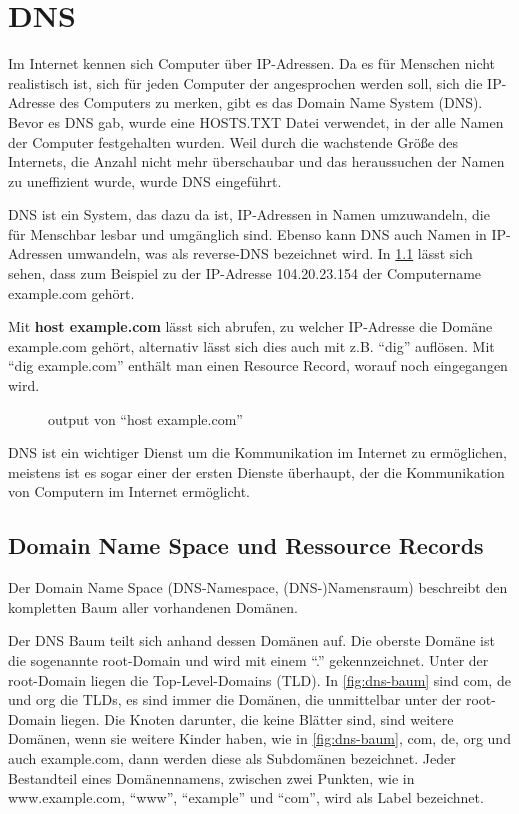 \chapter{DNS}
\label{chapter-DNS}
Im Internet kennen sich Computer über IP-Adressen.
Da es für Menschen nicht realistisch ist, sich für jeden Computer der angesprochen werden soll, sich die IP-Adresse des Computers zu merken,
gibt es das Domain Name System (DNS).
Bevor es DNS gab, wurde eine HOSTS.TXT Datei verwendet, in der alle Namen der Computer festgehalten wurden.
Weil durch die wachstende Größe des Internets, die Anzahl nicht mehr überschaubar und das heraussuchen der Namen zu uneffizient wurde,
wurde DNS eingeführt.

DNS ist ein System, das dazu da ist, IP-Adressen in Namen umzuwandeln, die für Menschbar lesbar und umgänglich sind.
Ebenso kann DNS auch Namen in IP-Adressen umwandeln, was als reverse-DNS bezeichnet wird.
In \ref{fig:output-host-example.com} lässt sich sehen, dass zum Beispiel zu der IP-Adresse 104.20.23.154 der Computername example.com gehört.

Mit \textbf{host example.com} lässt sich abrufen, zu welcher IP-Adresse die Domäne example.com gehört, alternativ lässt sich dies auch mit z.B. \enquote{dig} auflösen.
Mit \enquote{dig example.com} enthält man einen Resource Record, worauf noch eingegangen wird.
\begin{figure}[htbp]
  \centering
  
  \caption{output von \enquote{host example.com}}
  \label{fig:output-host-example.com}
\end{figure}

DNS ist ein wichtiger Dienst um die Kommunikation im Internet zu ermöglichen, meistens ist es sogar einer der ersten Dienste überhaupt, der die Kommunikation von Computern im Internet ermöglicht.\\

\section{Domain Name Space und Ressource Records}
Der Domain Name Space (DNS-Namespace, (DNS-)Namensraum) beschreibt den kompletten Baum aller vorhandenen Domänen.

Der DNS Baum teilt sich anhand dessen Domänen auf. Die oberste Domäne ist die sogenannte root-Domain und wird mit einem \enquote{.} gekennzeichnet.
Unter der root-Domain liegen die Top-Level-Domains (TLD).
In \ref{fig:dns-baum} sind com, de und org die TLDs, es sind immer die Domänen, die unmittelbar unter der root-Domain liegen.
Die Knoten darunter, die keine Blätter sind, sind weitere Domänen, wenn sie weitere Kinder haben, wie in \ref{fig:dns-baum}, com, de, org und auch example.com, dann werden diese als Subdomänen bezeichnet.
Jeder Bestandteil eines Domänennamens, zwischen zwei Punkten, wie in www.example.com, \enquote{www}, \enquote{example} und \enquote{com}, wird als Label bezeichnet.

